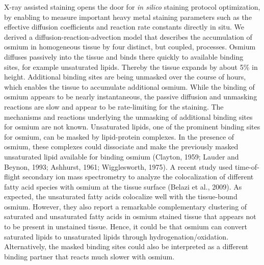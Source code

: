 \documentclass{article}
\begin{document}
X-ray assisted staining opens the door for \emph{in silico} staining protocol optimization, by enabling to measure important heavy metal staining parameters such as the effective diffusion coefficients and reaction rate constants directly in situ. We derived a diffusion-reaction-advection model that describes the accumulation of osmium in homogeneous tissue by four distinct, but coupled, processes. Osmium diffuses passively into the tissue and binds there quickly to available binding sites, for example unsaturated lipids. Thereby the tissue expands by about 5\% in height. Additional binding sites are being unmasked over the course of hours, which enables the tissue to accumulate additional osmium. While the binding of osmium appears to be nearly instantaneous, the passive diffusion and unmasking reactions are slow and appear to be rate-limiting for the staining. The mechanisms and reactions underlying the unmasking of additional binding sites for osmium are not known. Unsaturated lipids, one of the prominent binding sites for osmium, can be masked by lipid-protein complexes. In the presence of osmium, these complexes could dissociate and make the previously masked unsaturated lipid available for binding osmium (Clayton, 1959; Lauder and Beynon, 1993; Ashhurst, 1961; Wigglesworth, 1975). A recent study used time-of-flight secondary ion mass spectrometry to analyze the colocalization of different fatty acid species with osmium at the tissue surface (Belazi et al., 2009). As expected, the unsaturated fatty acids colocalize well with the tissue-bound osmium. However, they also report a remarkable complementary clustering of saturated and unsaturated fatty acids in osmium stained tissue that appears not to be present in unstained tissue. Hence, it could be that osmium can convert saturated lipids to unsaturated lipids through hydrogenation/oxidation. Alternatively, the masked binding sites could also be interpreted as a different binding partner that reacts much slower with osmium.
\end{document}

